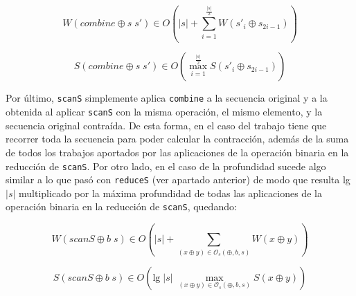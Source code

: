\documentclass[a4paper,10pt]{article}
\begin{document}

\begin{equation*}
    W \left( combine \oplus s \; s' \right) \in
    O \left( \vert s \vert + \sum_{i=1}^{\frac{\vert s \vert}{2}} W \left( s'_{i} \oplus s_{2i-1} \right) \right)
\end{equation*}

\begin{equation*}
    S \left( combine \oplus s \; s' \right) \in
    O \left( \max_{i=1}^{\frac{\vert s \vert}{2}} S \left( s'_{i} \oplus s_{2i-1} \right) \right)
\end{equation*}

Por último, \texttt{scanS} simplemente aplica \texttt{combine} a la secuencia original
y a la obtenida al aplicar \texttt{scanS} con la misma operación, el mismo elemento,
y la secuencia original contraída. De esta forma, en el caso del trabajo tiene
que recorrer toda la secuencia para poder calcular la contracción, además de la
suma de todos los trabajos aportados por las aplicaciones de la operación binaria
en la reducción de \texttt{scanS}. Por otro lado, en el caso de la profundidad
sucede algo similar a lo que pasó con \texttt{reduceS} (ver apartado anterior) de
modo que resulta lg $\vert s \vert$ multiplicado por la máxima profundidad de
todas las aplicaciones de la operación binaria en la reducción de \texttt{scanS},
quedando:

\begin{equation*}
    W \left( scanS \oplus b \; s \right) \in
    O \left( \vert s \vert + \sum_{(x \oplus y) \in \mathcal{O}_s(\oplus,b,s)} W \left( x \oplus y \right) \right)
\end{equation*}

\begin{equation*}
    S \left( scanS \oplus b \; s \right) \in
    O \left( \text{lg} \; \vert s \vert \; \max_{(x \oplus y) \in \mathcal{O}_s(\oplus,b,s)} S \left( x \oplus y \right) \right)
\end{equation*}
\end{document}
